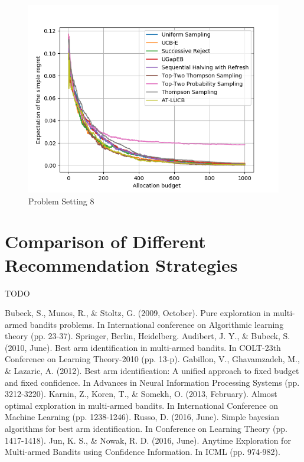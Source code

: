 \documentclass[runningheads,a4paper]{llncs}
\begin{document}
\begin{figure}[ht]
    	\centering\includegraphics[width=\textwidth]{../results/ttts/setting0.png}
    	\caption{Problem Setting 8}
	\label{ttts_0}
\end{figure}

\section{Comparison of Different Recommendation Strategies}

TODO

\begin{thebibliography}{4}

 Bubeck, S., Munos, R., \& Stoltz, G. (2009, October). Pure exploration in multi-armed bandits problems. In International conference on Algorithmic learning theory (pp. 23-37). Springer, Berlin, Heidelberg.
 Audibert, J. Y., \& Bubeck, S. (2010, June). Best arm identification in multi-armed bandits. In COLT-23th Conference on Learning Theory-2010 (pp. 13-p).
 Gabillon, V., Ghavamzadeh, M., \& Lazaric, A. (2012). Best arm identification: A unified approach to fixed budget and fixed confidence. In Advances in Neural Information Processing Systems (pp. 3212-3220).
 Karnin, Z., Koren, T., \& Somekh, O. (2013, February). Almost optimal exploration in multi-armed bandits. In International Conference on Machine Learning (pp. 1238-1246).
 Russo, D. (2016, June). Simple bayesian algorithms for best arm identification. In Conference on Learning Theory (pp. 1417-1418).
 Jun, K. S., \& Nowak, R. D. (2016, June). Anytime Exploration for Multi-armed Bandits using Confidence Information. In ICML (pp. 974-982).

\end{thebibliography}


\end{document}
